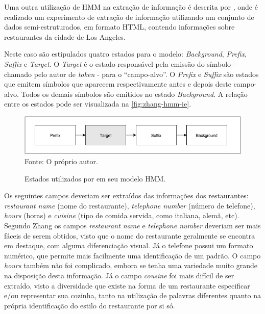 
Uma outra utilização de HMM na extração de informação é descrita por \cite{Zhang-HMM-IE}, onde é realizado um experimento de extração de informação utilizando um conjunto de dados semi-estruturados, em formato HTML, contendo informações sobre restaurantes da cidade de Los Angeles.

Neste caso são estipulados quatro estados para o modelo: \textit{Background}, \textit{Prefix}, \textit{Suffix} e \textit{Target}. O \textit{Target} é o estado responsável pela emissão do símbolo - chamado pelo autor de \textit{token} - para o ``campo-alvo''. O \textit{Prefix} e \textit{Suffix} são estados que emitem símbolos que aparecem respectivamente antes e depois deste campo-alvo. Todos os demais símbolos são emitidos no estado \textit{Background}. A relação entre os estados pode ser visualizada na \autoref{fig:zhang-hmm-ie}.

\begin{figure}
    \centering
    \caption{Estados utilizados por \cite{Zhang-HMM-IE} em seu modelo HMM.}
    \label{fig:zhang-hmm-ie}
    \includegraphics[width=0.8\linewidth]{./assets/images/zhang-hmm-ie}
    \center\footnotesize{Fonte: O próprio autor.}
\end{figure}

Os seguintes campos deveriam ser extraídos das informações dos restaurantes: \textit{restaurant name} (nome do restaurante), \textit{telephone number} (número de telefone), \textit{hours} (horas) e \textit{cuisine} (tipo de comida servida, como italiana, alemã, etc). Segundo Zhang \cite{Zhang-HMM-IE} os campos \textit{restaurant name} e \textit{telephone number} deveriam ser mais fáceis de serem obtidos, visto que o nome do restaurante geralmente se encontra em destaque, com alguma diferenciação visual. Já o telefone possui um formato numérico, que permite mais facilmente uma identificação de um padrão. O campo \textit{hours} também não foi complicado, embora se tenha uma variedade muito grande na disposição desta informação. Já o campo \textit{cousine} foi mais difícil de ser extraído, visto a diversidade que existe na forma de um restaurante especificar e/ou representar sua cozinha, tanto na utilização de palavras diferentes quanto na própria identificação do estilo do restaurante por si só.

